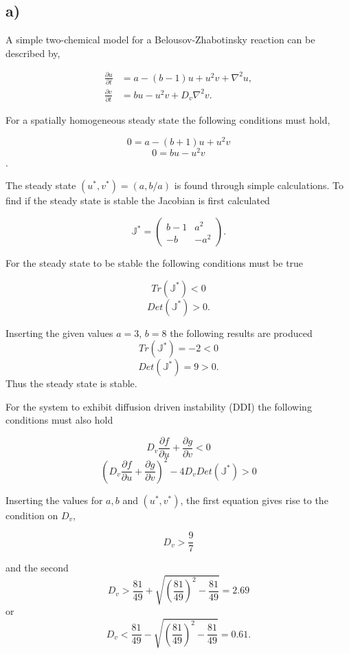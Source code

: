 \subsection*{a)}

A simple two-chemical model for a Belousov-Zhabotinsky reaction can be described by,

\begin{align}
\label{eq:2a}
\frac{\partial u}{\partial t}& = a - (b-1)u + u^2v + \nabla^2 u,\\
\frac{\partial v}{\partial t}& = bu - u^2v + D_v \nabla^2 v.
\end{align}

For a spatially homogeneous steady state the following conditions must hold,

$$0 = a - (b+1)u + u^2v$$
$$0 = bu - u^2v$$.

The steady state $(u^*,v^*)=(a,b/a)$ is found through simple calculations. To find if the steady state is stable the Jacobian is first calculated

\begin{equation}
\mathbb{J}^* = \left(
\begin{array}{cc}
    b-1 & a^2 \\
    -b  & -a^2
\end{array}
\right).
\end{equation}

For the steady state to be stable the following conditions must be true

$$Tr(\mathbb{J}^*) < 0$$
$$Det(\mathbb{J}^*) > 0.$$

Inserting the given values $a=3$, $b=8$ the following results are produced
$$Tr(\mathbb{J}^*) = -2 < 0$$
$$Det(\mathbb{J}^*) = 9 > 0.$$
Thus the steady state is stable.

For the system to exhibit diffusion driven instability (DDI) the following conditions must also hold

$$D_v \frac{\partial f}{\partial u} + \frac{\partial g}{\partial v} < 0$$
$$(D_v \frac{\partial f}{\partial u}+ \frac{\partial g}{\partial v})^2 - 4D_v Det(\mathbb{J}^*) > 0$$

Inserting the values for $a, b$ and $(u^*, v^*)$, the first equation gives rise to the condition on $D_v$,

$$D_v > \frac{9}{7}$$

and the second
$$D_v > \frac{81}{49} + \sqrt{\left(\frac{81}{49}\right)^2 - \frac{81}{49}} = 2.69$$
or
$$D_v < \frac{81}{49} - \sqrt{\left(\frac{81}{49}\right)^2 - \frac{81}{49}} = 0.61.$$

